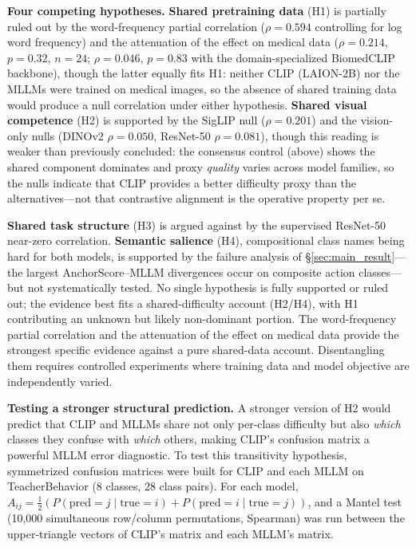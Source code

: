 \documentclass[a4paper,fleqn]{cas-sc}
\begin{document}
\textbf{Four competing hypotheses.} \textbf{Shared pretraining data} (H1) is partially ruled out by the word-frequency partial correlation ($\rho=0.594$ controlling for log word frequency) and the attenuation of the effect on medical data ($\rho=0.214$, $p=0.32$, $n=24$; $\rho=0.046$, $p=0.83$ with the domain-specialized BiomedCLIP backbone), though the latter equally fits H1: neither CLIP (LAION-2B) nor the MLLMs were trained on medical images, so the absence of shared training data would produce a null correlation under either hypothesis. \textbf{Shared visual competence} (H2) is supported by the SigLIP null ($\rho=0.201$) and the vision-only nulls (DINOv2 $\rho=0.050$, ResNet-50 $\rho=0.081$), though this reading is weaker than previously concluded: the consensus control (above) shows the shared component dominates and proxy \emph{quality} varies across model families, so the nulls indicate that CLIP provides a better difficulty proxy than the alternatives---not that contrastive alignment is the operative property per se.

\textbf{Shared task structure} (H3) is argued against by the supervised ResNet-50 near-zero correlation. \textbf{Semantic salience} (H4), compositional class names being hard for both models, is supported by the failure analysis of \S\ref{sec:main_result}---the largest AnchorScore--MLLM divergences occur on composite action classes---but not systematically tested. No single hypothesis is fully supported or ruled out; the evidence best fits a shared-difficulty account (H2/H4), with H1 contributing an unknown but likely non-dominant portion. The word-frequency partial correlation and the attenuation of the effect on medical data provide the strongest specific evidence against a pure shared-data account. Disentangling them requires controlled experiments where training data and model objective are independently varied.

\textbf{Testing a stronger structural prediction.} A stronger version of H2 would predict that CLIP and MLLMs share not only per-class difficulty but also \emph{which} classes they confuse with \emph{which} others, making CLIP's confusion matrix a powerful MLLM error diagnostic. To test this transitivity hypothesis, symmetrized confusion matrices were built for CLIP and each MLLM on TeacherBehavior (8 classes, 28 class pairs). For each model, $A_{ij}=\tfrac{1}{2}(P(\text{pred}{=}j\!\mid\!\text{true}{=}i)+P(\text{pred}{=}i\!\mid\!\text{true}{=}j))$, and a Mantel test (10{,}000 simultaneous row/column permutations, Spearman) was run between the upper-triangle vectors of CLIP's matrix and each MLLM's matrix.
\end{document}
